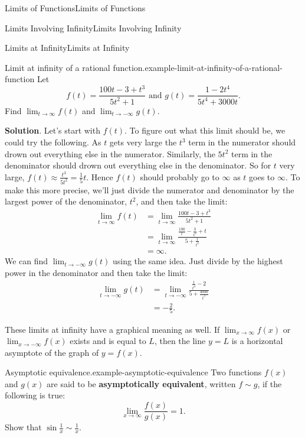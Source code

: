 \documentclass[10pt,]{book}
\newcommand{\terminology}[1]{\textbf{#1}}
\numberwithin{equation}{section}
\begin{document}
\begin{chapterptx}{Limits of Functions}{}{Limits of Functions}{}{}
\begin{sectionptx}{Limits Involving Infinity}{}{Limits Involving Infinity}{}{}
\begin{subsectionptx}{Limits at Infinity}{}{Limits at Infinity}{}{}
\begin{example}{Limit at infinity of a rational function.}{example-limit-at-infinity-of-a-rational-function}
\hypertarget{p-68}{}%
Let%
\begin{equation*}
f(t) = \frac{100t - 3 + t^{3}}{5t^{2}+1}\text{ and } g(t) = \frac{1-2t^{4}}{5t^{4}+3000t}.
\end{equation*}
Find \(\lim_{t\to\infty} f(t)\) and \(\lim_{t\to-\infty}g(t)\).%
\par\smallskip%
\noindent\textbf{Solution}.\hypertarget{solution-14}{}\quad%
\hypertarget{p-69}{}%
Let's start with \(f(t)\). To figure out what this limit should be, we could try the following. As \(t\) gets very large the \(t^{3}\) term in the numerator should drown out everything else in the numerator. Similarly, the \(5t^{2}\) term in the denominator should drown out everything else in the denominator. So for \(t\) very large, \(f(t)\approx\frac{t^{3}}{5t^{2}} = \frac{1}{5}t\). Hence \(f(t)\) should probably go to \(\infty\) as \(t\) goes to \(\infty\). To make this more precise, we'll just divide the numerator and denominator by the largest power of the denominator, \(t^{2}\), and then take the limit:%
%
\begin{align*}
\lim_{t\to\infty}f(t) & = \lim_{t\to\infty}\frac{100t-3+t^{3}}{5t^{2}+1} \\
& = \lim_{t\to\infty}\frac{\frac{100}{t} - \frac{3}{t^{2}}+t}{5+\frac{1}{t^{2}}} \\
& = \infty. 
\end{align*}
\hypertarget{p-70}{}%
We can find \(\lim_{t\to-\infty}g(t)\) using the same idea. Just divide by the highest power in the denominator and then take the limit:%
%
\begin{align*}
\lim_{t\to-\infty}g(t) & = \lim_{t\to-\infty}\frac{\frac{1}{t^{4}}-2}{5+\frac{3000}{t^{3}}} \\
& = -\frac{2}{5}. 
\end{align*}
\end{example}
\hypertarget{p-71}{}%
These limits at infinity have a graphical meaning as well. If \(\lim_{x\to\infty}f(x)\) or \(\lim_{x\to-\infty}f(x)\) exists and is equal to \(L\), then the line \(y=L\) is a horizontal asymptote of the graph of \(y=f(x)\).%
\begin{example}{Asymptotic equivalence.}{example-asymptotic-equivalence}%
\hypertarget{p-72}{}%
Two functions \(f(x)\) and \(g(x)\) are said to be \terminology{asymptotically equivalent}, written \(f\sim g\), if the following is true:%
\begin{equation*}
\lim_{x\to\infty}\frac{f(x)}{g(x)} = 1.
\end{equation*}
Show that \(\sin\frac{1}{x}\sim\frac{1}{x}\).%

\end{example}
\end{subsectionptx}
\end{sectionptx}
\end{chapterptx}
\end{document}
